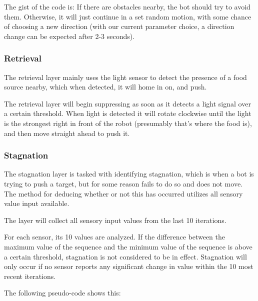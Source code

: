 \documentclass[a4paper,10pt]{article}
\newcommand{\tickspersecond}{10}
\begin{document}
The gist of the code is: If there are obstacles nearby, the bot should try
to avoid them. Otherwise, it will just continue in a set random motion, with
some chance of choosing a new direction (with our current parameter choice, a
direction change can be expected after 2-3 seconds). 

\subsubsection{Retrieval}
The retrieval layer mainly uses the light sensor to detect the presence of a
food source nearby, which when detected, it will home in on, and push.

The retrieval layer will begin suppressing as soon as it detects a light
signal over a certain threshold. When light is detected it will rotate clockwise until 
the light is the strongest right in front of the robot (presumably that's where 
the food is), and then move straight ahead to push it.

\subsubsection{Stagnation}
The stagnation layer is tasked with identifying stagnation, which is when a 
bot is trying to push a target, but for some reason fails to do so and does 
not move. The method for deducing whether or not this has occurred utilizes 
all sensory value input available.

The layer will collect all sensory input values from the last 
{\tickspersecond} iterations.  

For each sensor, its {\tickspersecond} values are analyzed. If the difference 
between the maximum value of the sequence and the minimum value of the 
sequence is above a certain threshold, stagnation is not considered to be in 
effect. Stagnation will only occur if no sensor reports any significant change 
in value within the {\tickspersecond} most recent iterations.

The following pseudo-code shows this:
\end{document}
